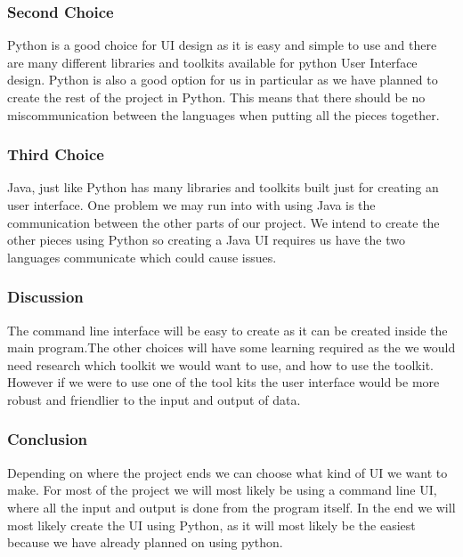 	\subsubsection*{Second Choice}
	Python is a good choice for UI design as it is easy and simple to use and there are many different libraries and toolkits available for python User Interface design. Python is also a good option for us in particular as we have planned to create the rest of the project in Python. This means that there should be no miscommunication between the languages when putting all the pieces together.
	\subsubsection*{Third Choice}
	Java, just like Python has many libraries and toolkits built just for creating an user interface. One problem we may run into with using Java is the communication between the other parts of our project. We intend to create the other pieces using Python so creating a Java UI requires us have the two languages communicate which could cause issues.
	\subsubsection*{Discussion}
	The command line interface will be easy to create as it can be created inside the main program.The other choices will have some learning required as the we would need research which toolkit we would want to use, and how to use the toolkit. However if we were to use one of the tool kits the user interface would be more robust and friendlier to the input and output of data.
	\subsubsection*{Conclusion}		
	Depending on where the project ends we can choose what kind of UI we want to make. For most of the project we will most likely be using a command line UI, where all the input and output is done from the program itself. In the end we will most likely create the UI using Python, as it will most likely be the easiest because we have already planned on using python.

